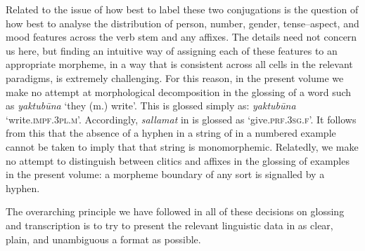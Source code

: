 \documentclass[output=paper]{langsci/langscibook}
\begin{document}
Related to the issue of how best to label these two conjugations is the question of how best to analyse the distribution of person, number, {gender}, tense--aspect, and mood features across the verb {stem} and any affixes. The details need not concern us here, but finding an intuitive way of assigning each of these features to an appropriate morpheme, in a way that is consistent across all cells in the relevant paradigms, is extremely challenging. For this reason, in the present volume we make no attempt at morphological decomposition in the glossing of a word such as  \textit{yaktubūna} `they (m.) write'. This is glossed simply as: \textit{yaktubūna} `write.\textsc{impf.3pl.m}'. Accordingly, \textit{sallamat} in  is glossed as `give.\textsc{prf.3sg.f}'. It follows from this that the absence of a hyphen in a string of  in a numbered example cannot be taken to imply that that string is monomorphemic. Relatedly, we make no attempt to distinguish between clitics and affixes in the glossing of  examples in the present volume: a morpheme boundary of any sort is signalled by a hyphen.


The overarching principle we have followed in all of these decisions on glossing and transcription is to try to present the relevant linguistic data in as clear, plain, and unambiguous a format as possible.
\end{document}
